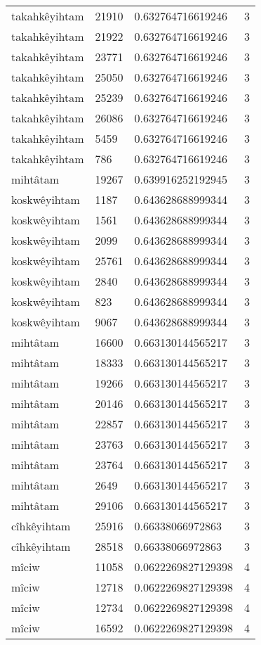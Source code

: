 \begin{longtable}{llll}
takahkêyihtam & 21910 & 0.632764716619246 & 3 \\
takahkêyihtam & 21922 & 0.632764716619246 & 3 \\
takahkêyihtam & 23771 & 0.632764716619246 & 3 \\
takahkêyihtam & 25050 & 0.632764716619246 & 3 \\
takahkêyihtam & 25239 & 0.632764716619246 & 3 \\
takahkêyihtam & 26086 & 0.632764716619246 & 3 \\
takahkêyihtam & 5459 & 0.632764716619246 & 3 \\
takahkêyihtam & 786 & 0.632764716619246 & 3 \\
mihtâtam & 19267 & 0.639916252192945 & 3 \\
koskwêyihtam & 1187 & 0.643628688999344 & 3 \\
koskwêyihtam & 1561 & 0.643628688999344 & 3 \\
koskwêyihtam & 2099 & 0.643628688999344 & 3 \\
koskwêyihtam & 25761 & 0.643628688999344 & 3 \\
koskwêyihtam & 2840 & 0.643628688999344 & 3 \\
koskwêyihtam & 823 & 0.643628688999344 & 3 \\
koskwêyihtam & 9067 & 0.643628688999344 & 3 \\
mihtâtam & 16600 & 0.663130144565217 & 3 \\
mihtâtam & 18333 & 0.663130144565217 & 3 \\
mihtâtam & 19266 & 0.663130144565217 & 3 \\
mihtâtam & 20146 & 0.663130144565217 & 3 \\
mihtâtam & 22857 & 0.663130144565217 & 3 \\
mihtâtam & 23763 & 0.663130144565217 & 3 \\
mihtâtam & 23764 & 0.663130144565217 & 3 \\
mihtâtam & 2649 & 0.663130144565217 & 3 \\
mihtâtam & 29106 & 0.663130144565217 & 3 \\
cîhkêyihtam & 25916 & 0.66338066972863 & 3 \\
cîhkêyihtam & 28518 & 0.66338066972863 & 3 \\
mîciw & 11058 & 0.0622269827129398 & 4 \\
mîciw & 12718 & 0.0622269827129398 & 4 \\
mîciw & 12734 & 0.0622269827129398 & 4 \\
mîciw & 16592 & 0.0622269827129398 & 4 \\

\end{longtable}
